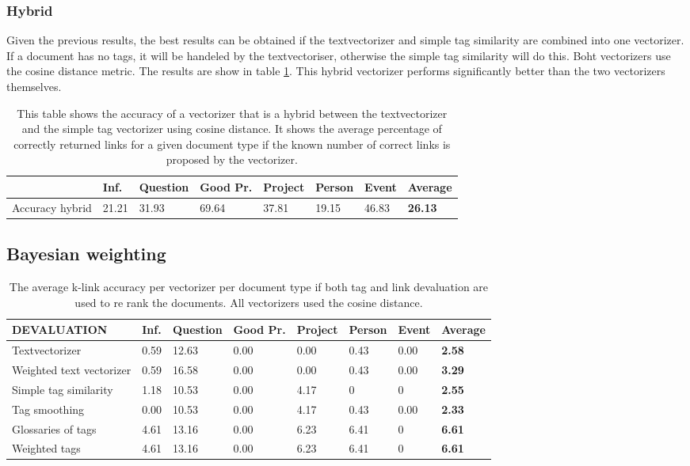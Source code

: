\subsubsection{Hybrid}
Given the previous results, the best results can be obtained if the textvectorizer and simple tag similarity are combined into one vectorizer. If a document has no tags, it will be handeled by the textvectoriser, otherwise the simple tag similarity will do this. Boht vectorizers use the cosine distance metric. The results are show in table \ref{hybrid}. This hybrid vectorizer performs significantly better than the two vectorizers themselves. 


\begin{table}[h!]
\begin{tabular}{| l | l | l | l | l | l | l | l |}
\hline
 & Inf. &  Question &  Good Pr.& Project & Person &  Event & {\bf Average} \\
\hline
Accuracy hybrid & 21.21 & 31.93 & 69.64 & 37.81 & 19.15 & 46.83 & {\bf 26.13}\\
\hline
\end{tabular}
\caption{This table shows the accuracy of a vectorizer that is a hybrid between the textvectorizer and the simple tag vectorizer using cosine distance. It shows the average percentage of correctly returned links for a given document type if the known number of correct links is proposed by the vectorizer.}
\label{hybrid}
\end{table}

\subsection{Bayesian weighting}
\begin{table}
\begin{tabular}{| l | l | l | l | l | l | l | l |}
\hline
DEVALUATION & Inf. &  Question &  Good Pr.& Project & Person &  Event & {\bf Average} \\
\hline
Textvectorizer & 0.59 & 12.63 & 0.00 & 0.00 & 0.43 & 0.00 & {\bf 2.58}\\
Weighted text vectorizer & 0.59 & 16.58 & 0.00 & 0.00 & 0.43 & 0.00 & {\bf 3.29} \\ 
Simple tag similarity & 1.18 & 10.53 & 0.00 & 4.17& 0 & 0 & {\bf 2.55}\\
Tag smoothing & 0.00 & 10.53 & 0.00 & 4.17 & 0.43 & 0.00 & {\bf 2.33}\\
Glossaries of tags & 4.61 & 13.16 & 0.00 & 6.23 & 6.41 & 0 & {\bf 6.61}\\
Weighted tags & 4.61 & 13.16 & 0.00 & 6.23 & 6.41 & 0 & {\bf 6.61}\\
\hline
\end{tabular}
\caption{The average k-link accuracy per vectorizer per document type if both tag and link devaluation are used to re rank the documents. All vectorizers used the cosine distance.}
\label{bayes_table1}
\end{table}

